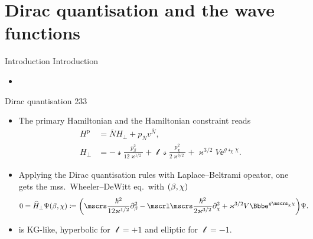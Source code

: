 \documentclass[9pt]{beamer}
\begin{document}
\section{Dirac quantisation and the wave functions}

\begin{frame}%
{Introduction}%
{Introduction}
\begin{itemize}
	\item
\end{itemize}
\end{frame}

\begin{frame}%
{Dirac quantisation}%
{233}
\begin{itemize}
\item
The primary Hamiltonian and the Hamiltonian constraint reads
\begin{align}
H^\text{p} &= \overline{N}H_\perp + p_{\overline{N}} v^{\overline{N}},
\\
H_\perp &= -\mscrs\frac{p_\beta^2}{12\varkappa^{1/2}}
+\mscrl\mscrs\frac{p_\chi^2}{2\varkappa^{3/2}}
+\varkappa^{3/2}V\ee^{g\mscrs_\chi\chi}.
\end{align}
\item
Applying the Dirac quantisation rules with Laplace--Beltrami opeator, one 
gets the mss.\ Wheeler--DeWitt eq.\ with ${\left(\beta,\chi\right)}$
\begin{align}
0 &= \widehat{H}_\perp \rfun{\Psi}{\beta,\chi} \coloneqq
\rbr{\mscrs\frac{\hslash^2}{12\varkappa^{1/2}}\partial_{\beta}^2
-\mscrl\mscrs\frac{\hslash^2}{2\varkappa^{3/2}}\partial_{\chi}^2
+\varkappa^{3/2}V\ee^{g\mscrs_\chi\chi}}\Psi.
\label{eq:WDW-10}
\end{align}
\item
{} is KG-like, hyperbolic for $\mscrl = +1$ and 
\alert{elliptic} for $\mscrl = -1$.
\end{itemize}
\end{frame}
\end{document}

